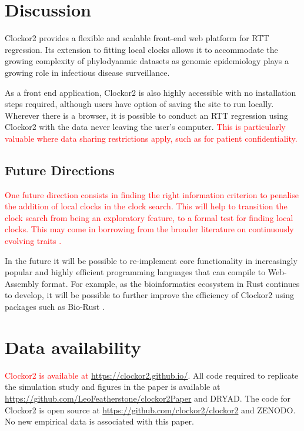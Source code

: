 \documentclass{article}
\begin{document}
\section*{Discussion}
Clockor2 provides a flexible and scalable front-end web platform for RTT regression. Its extension to fitting local clocks allows it to accommodate the growing complexity of phylodyanmic datasets as genomic epidemiology plays a growing role in infectious disease surveillance. 

As a front end application, Clockor2 is also highly accessible with no installation steps required, although users have option of saving the site to run locally. Wherever there is a browser, it is possible to conduct an RTT regression using Clockor2 with the data never leaving the user's computer. \textcolor{red}{This is particularly valuable where data sharing restrictions apply, such as for patient confidentiality.}

\subsection*{Future Directions}
\textcolor{red}{One future direction consists in finding the right information criterion to penalise the addition of local clocks in the clock search. This will help to transition the clock search from being an exploratory feature, to a formal test for finding local clocks. This may come in borrowing from the broader literature on continuously evolving traits \citep{bastide_2017_detection,khabbazian_2016_fast}.}

In the future it will be possible to re-implement core functionality in increasingly popular and highly efficient programming languages that can compile to Web-Assembly format. For example, as the bioinformatics ecosystem in Rust continues to develop, it will be possible to further improve the efficiency of Clockor2 using packages such as Bio-Rust \citep{koester_rust-bio-2015}.

\section*{Data availability}
\textcolor{red}{Clockor2 is available at \url{https://clockor2.github.io/}}. All code required to replicate the simulation study and figures in the paper is available at \url{https://github.com/LeoFeatherstone/clockor2Paper} and DRYAD. The code for Clockor2 is open source at \url{https://github.com/clockor2/clockor2} and ZENODO. No new empirical data is associated with this paper.
\end{document}
